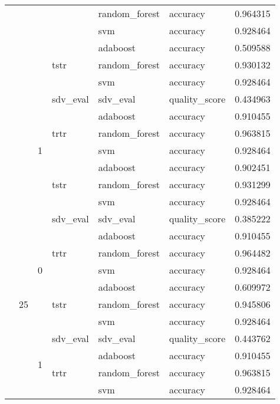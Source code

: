 \begin{longtable}{llllllr}
\cline{5-7}
 &  &  &  & random_forest & accuracy & 0.964315 \\
\cline{5-7}
 &  &  &  & svm & accuracy & 0.928464 \\
\cline{4-7} \cline{5-7}
 &  &  & \multirow[t]{3}{*}{tstr} & adaboost & accuracy & 0.509588 \\
\cline{5-7}
 &  &  &  & random_forest & accuracy & 0.930132 \\
\cline{5-7}
 &  &  &  & svm & accuracy & 0.928464 \\
\cline{3-7} \cline{4-7} \cline{5-7}
 &  & \multirow[t]{7}{*}{1} & sdv_eval & sdv_eval & quality_score & 0.434963 \\
\cline{4-7} \cline{5-7}
 &  &  & \multirow[t]{3}{*}{trtr} & adaboost & accuracy & 0.910455 \\
\cline{5-7}
 &  &  &  & random_forest & accuracy & 0.963815 \\
\cline{5-7}
 &  &  &  & svm & accuracy & 0.928464 \\
\cline{4-7} \cline{5-7}
 &  &  & \multirow[t]{3}{*}{tstr} & adaboost & accuracy & 0.902451 \\
\cline{5-7}
 &  &  &  & random_forest & accuracy & 0.931299 \\
\cline{5-7}
 &  &  &  & svm & accuracy & 0.928464 \\
\cline{2-7} \cline{3-7} \cline{4-7} \cline{5-7}
 & \multirow[t]{14}{*}{25} & \multirow[t]{7}{*}{0} & sdv_eval & sdv_eval & quality_score & 0.385222 \\
\cline{4-7} \cline{5-7}
 &  &  & \multirow[t]{3}{*}{trtr} & adaboost & accuracy & 0.910455 \\
\cline{5-7}
 &  &  &  & random_forest & accuracy & 0.964482 \\
\cline{5-7}
 &  &  &  & svm & accuracy & 0.928464 \\
\cline{4-7} \cline{5-7}
 &  &  & \multirow[t]{3}{*}{tstr} & adaboost & accuracy & 0.609972 \\
\cline{5-7}
 &  &  &  & random_forest & accuracy & 0.945806 \\
\cline{5-7}
 &  &  &  & svm & accuracy & 0.928464 \\
\cline{3-7} \cline{4-7} \cline{5-7}
 &  & \multirow[t]{7}{*}{1} & sdv_eval & sdv_eval & quality_score & 0.443762 \\
\cline{4-7} \cline{5-7}
 &  &  & \multirow[t]{3}{*}{trtr} & adaboost & accuracy & 0.910455 \\
\cline{5-7}
 &  &  &  & random_forest & accuracy & 0.963815 \\
\cline{5-7}
 &  &  &  & svm & accuracy & 0.928464 \\

\end{longtable}
